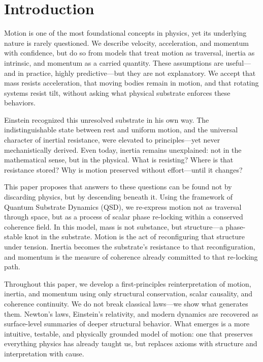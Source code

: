 \documentclass[entropy,article,submit,pdftex,moreauthors]{Definitions/mdpi}
\begin{document}

\section{Introduction}

Motion is one of the most foundational concepts in physics, yet its underlying nature is rarely questioned. We describe velocity, acceleration, and momentum with confidence, but do so from models that treat motion as traversal, inertia as intrinsic, and momentum as a carried quantity. These assumptions are useful---and in practice, highly predictive---but they are not explanatory. We accept that mass resists acceleration, that moving bodies remain in motion, and that rotating systems resist tilt, without asking what physical substrate enforces these behaviors.

Einstein recognized this unresolved substrate in his own way. The indistinguishable state between rest and uniform motion, and the universal character of inertial resistance, were elevated to principles---yet never mechanistically derived. Even today, inertia remains unexplained: not in the mathematical sense, but in the physical. What is resisting? Where is that resistance stored? Why is motion preserved without effort---until it changes?

This paper proposes that answers to these questions can be found not by discarding physics, but by descending beneath it. Using the framework of Quantum Substrate Dynamics (QSD), we re-express motion not as traversal through space, but as a process of scalar phase re-locking within a conserved coherence field. In this model, mass is not substance, but structure---a phase-stable knot in the substrate. Motion is the act of reconfiguring that structure under tension. Inertia becomes the substrate's resistance to that reconfiguration, and momentum is the measure of coherence already committed to that re-locking path.

Throughout this paper, we develop a first-principles reinterpretation of motion, inertia, and momentum using only structural conservation, scalar causality, and coherence continuity. We do not break classical laws---we show what generates them. Newton’s laws, Einstein’s relativity, and modern dynamics are recovered as surface-level summaries of deeper structural behavior. What emerges is a more intuitive, testable, and physically grounded model of motion: one that preserves everything physics has already taught us, but replaces axioms with structure and interpretation with cause.
\end{document}
